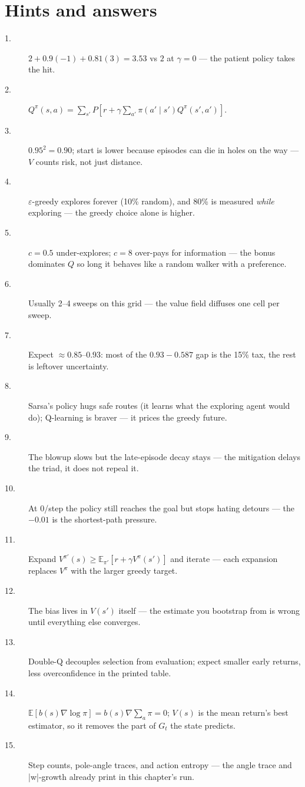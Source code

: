 \section*{Hints and answers}
\begin{description}
\item[1.] $2 + 0.9(-1) + 0.81(3) = 3.53$ vs $2$ at $\gamma{=}0$ ---
the patient policy takes the hit.
\item[2.] $Q^\pi(s,a) = \sum_{s'} P[r + \gamma \sum_{a'} \pi(a'\mid s')
Q^\pi(s',a')]$.
\item[3.] $0.95^2 = 0.90$; start is lower because episodes can die in
holes on the way --- $V$ counts risk, not just distance.
\item[4.] $\varepsilon$-greedy explores forever (10\% random), and
80\% is measured \emph{while} exploring --- the greedy choice alone
is higher.
\item[5.] $c{=}0.5$ under-explores; $c{=}8$ over-pays for information
--- the bonus dominates $Q$ so long it behaves like a random walker
with a preference.
\item[6.] Usually 2--4 sweeps on this grid --- the value field
diffuses one cell per sweep.
\item[7.] Expect $\approx 0.85$--$0.93$: most of the $0.93-0.587$ gap
is the 15\% tax, the rest is leftover uncertainty.
\item[8.] Sarsa's policy hugs safe routes (it learns what the
exploring agent would do); Q-learning is braver --- it prices the
greedy future.
\item[9.] The blowup slows but the late-episode decay stays --- the
mitigation delays the triad, it does not repeal it.
\item[10.] At $0$/step the policy still reaches the goal but stops
hating detours --- the $-0.01$ is the shortest-path pressure.
\item[11.] Expand $V^{\pi'}(s) \geq \mathbb E_{\pi'}[r + \gamma
V^\pi(s')]$ and iterate --- each expansion replaces $V^\pi$ with the
larger greedy target.
\item[12.] The bias lives in $V(s')$ itself --- the estimate you
bootstrap from is wrong until everything else converges.
\item[13.] Double-Q decouples selection from evaluation; expect
smaller early returns, less overconfidence in the printed table.
\item[14.] $\mathbb E[b(s)\nabla\log\pi] = b(s)\nabla\sum_a\pi = 0$;
$V(s)$ is the mean return's best estimator, so it removes the
part of $G_t$ the state predicts.
\item[15.] Step counts, pole-angle traces, and action entropy --- the
angle trace and |w|-growth already print in this chapter's run.
\end{description}
